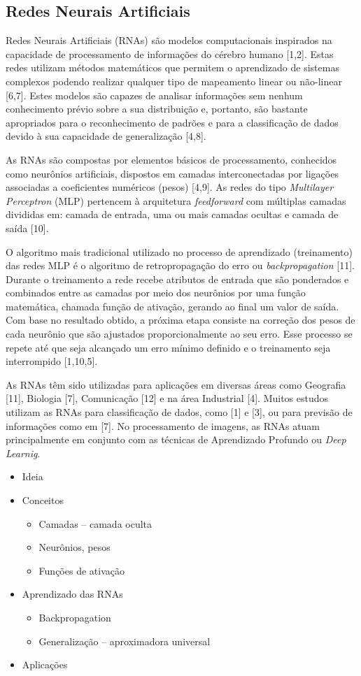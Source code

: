 \subsection{Redes Neurais Artificiais}
Redes Neurais Artificiais (RNAs) são modelos computacionais inspirados na capacidade de processamento de informações do cérebro humano [1,2]. Estas redes utilizam  métodos matemáticos que permitem o aprendizado de sistemas complexos podendo realizar qualquer tipo de mapeamento linear ou não-linear [6,7]. Estes modelos são capazes de analisar informações sem nenhum conhecimento prévio sobre a sua distribuição e, portanto, são bastante apropriados para o reconhecimento de padrões e para a classificação de dados devido à sua capacidade de generalização [4,8].

As RNAs são compostas por elementos básicos de processamento, conhecidos como neurônios artificiais, dispostos em camadas interconectadas por ligações associadas a coeficientes numéricos (pesos) [4,9]. As redes do tipo \textit{Multilayer Perceptron} (MLP) pertencem à arquitetura \textit{feedforward} com múltiplas camadas divididas em: camada de entrada, uma ou mais camadas ocultas e camada de saída [10]. 

O algoritmo mais tradicional utilizado no processo de aprendizado (treinamento) das redes MLP é o algoritmo de retropropagação do erro ou \textit{backpropagation} [11]. Durante o treinamento a rede recebe atributos de entrada que são ponderados e combinados entre as camadas por meio dos neurônios por uma função matemática, chamada função de ativação, gerando ao final um valor de saída. Com base no resultado obtido, a próxima etapa consiste na correção dos pesos de cada neurônio que são ajustados proporcionalmente ao seu erro. Esse processo se repete até que seja alcançado um erro mínimo definido e o treinamento seja interrompido [1,10,5].

As RNAs têm sido utilizadas para aplicações em diversas áreas como Geografia [11], Biologia [7], Comunicação [12] e na área Industrial [4]. Muitos estudos utilizam as RNAs para classificação de dados, como [1] e [3], ou para previsão de informações como em [7]. No processamento de imagens, as RNAs atuam principalmente em conjunto com as técnicas de Aprendizado Profundo ou \textit{Deep Learnig}. 

\begin{itemize}
	\item Ideia
	\item Conceitos
	\begin{itemize}
		\item Camadas -- camada oculta
		\item Neurônios, pesos
		\item Funções de ativação
	\end{itemize}
	\item Aprendizado das RNAs
	\begin{itemize}
		\item Backpropagation
		\item Generalização -- aproximadora universal
	\end{itemize}
	\item Aplicações
\end{itemize}
